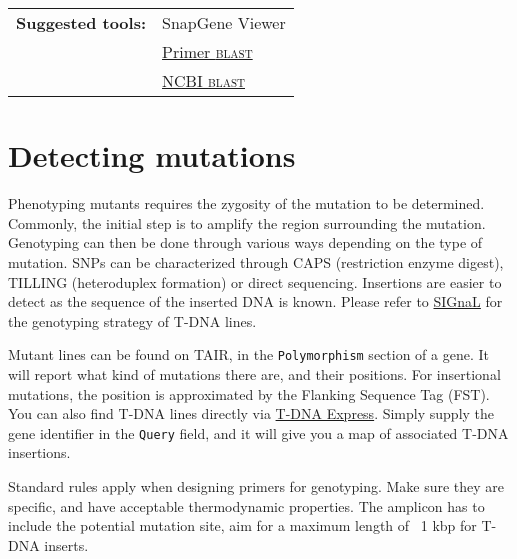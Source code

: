 \documentclass[11pt]{article}
\begin{document}
	\vspace*{\baselineskip}

	\noindent\begin{tabular}{@{}ll}
		\textbf{Suggested tools:} & SnapGene Viewer \\
		& \href{https://www.ncbi.nlm.nih.gov/tools/primer-blast/}{Primer \textsc{blast}} \\
		& \href{https://blast.ncbi.nlm.nih.gov/Blast.cgi}{NCBI \textsc{blast}} \\
	\end{tabular} 
	
	\section{Detecting mutations\label{sec:mut}}
 	Phenotyping mutants requires the zygosity of the mutation to be determined. Commonly, the initial step is to amplify the region surrounding the mutation. Genotyping can then be done through various ways depending on the type of mutation. SNPs can be characterized through CAPS (restriction enzyme digest), TILLING (heteroduplex formation) or direct sequencing. Insertions are easier to detect as the sequence of the inserted DNA is known. Please refer to \href{http://signal.salk.edu/tdnaprimers.2.html}{SIGnaL} for the genotyping strategy of T-DNA lines.
 	
 	Mutant lines can be found on TAIR, in the \texttt{Polymorphism} section of a gene. It will report what kind of mutations there are, and their positions. For insertional mutations, the position is approximated by the Flanking Sequence Tag (FST). You can also find T-DNA lines directly via  \href{http://signal.salk.edu/cgi-bin/tdnaexpress}{T-DNA Express}. Simply supply the gene identifier in the \texttt{Query} field, and it will give you a map of associated T-DNA insertions.
 	
 	Standard rules apply when designing primers for genotyping. Make sure they are specific, and have acceptable thermodynamic properties. The amplicon has to include the potential mutation site, aim for a maximum length of ~1 kbp for T-DNA inserts.
 	
\end{document}
